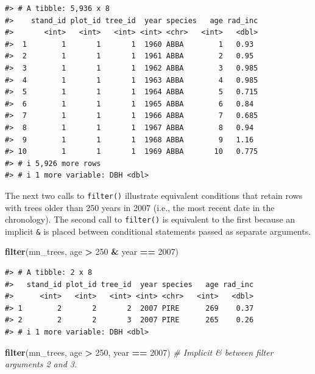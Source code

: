 \documentclass[
  11pt,
]{krantz}
\newenvironment{Shaded}{\begin{snugshade}}{\end{snugshade}}
\newcommand{\CommentTok}[1]{\textcolor[rgb]{0.56,0.35,0.01}{\textit{#1}}}
\newcommand{\DecValTok}[1]{\textcolor[rgb]{0.00,0.00,0.81}{#1}}
\newcommand{\KeywordTok}[1]{\textcolor[rgb]{0.13,0.29,0.53}{\textbf{#1}}}
\newcommand{\NormalTok}[1]{#1}
\newcommand{\OperatorTok}[1]{\textcolor[rgb]{0.81,0.36,0.00}{\textbf{#1}}}
\newcommand{\StringTok}[1]{\textcolor[rgb]{0.31,0.60,0.02}{#1}}
\theoremstyle{definition}
\theoremstyle{definition}
\theoremstyle{definition}
\theoremstyle{definition}
\theoremstyle{remark}
\begin{document}
\begin{verbatim}
#> # A tibble: 5,936 x 8
#>    stand_id plot_id tree_id  year species   age rad_inc
#>       <int>   <int>   <int> <int> <chr>   <int>   <dbl>
#>  1        1       1       1  1960 ABBA        1   0.93 
#>  2        1       1       1  1961 ABBA        2   0.95 
#>  3        1       1       1  1962 ABBA        3   0.985
#>  4        1       1       1  1963 ABBA        4   0.985
#>  5        1       1       1  1964 ABBA        5   0.715
#>  6        1       1       1  1965 ABBA        6   0.84 
#>  7        1       1       1  1966 ABBA        7   0.685
#>  8        1       1       1  1967 ABBA        8   0.94 
#>  9        1       1       1  1968 ABBA        9   1.16 
#> 10        1       1       1  1969 ABBA       10   0.775
#> # i 5,926 more rows
#> # i 1 more variable: DBH <dbl>
\end{verbatim}

The next two calls to \texttt{filter()} illustrate equivalent conditions that retain rows with trees older than 250 years in 2007 (i.e., the most recent date in the chronology). The second call to \texttt{filter()} is equivalent to the first because an implicit \texttt{\&} is placed between conditional statements passed as separate arguments.

\begin{Shaded}
\begin{Highlighting}[]
\KeywordTok{filter}\NormalTok{(mn\_trees, age }\OperatorTok{\textgreater{}}\StringTok{ }\DecValTok{250} \OperatorTok{\&}\StringTok{ }\NormalTok{year }\OperatorTok{==}\StringTok{ }\DecValTok{2007}\NormalTok{)}
\end{Highlighting}
\end{Shaded}

\begin{verbatim}
#> # A tibble: 2 x 8
#>   stand_id plot_id tree_id  year species   age rad_inc
#>      <int>   <int>   <int> <int> <chr>   <int>   <dbl>
#> 1        2       2       2  2007 PIRE      269    0.37
#> 2        2       2       3  2007 PIRE      265    0.26
#> # i 1 more variable: DBH <dbl>
\end{verbatim}

\begin{Shaded}
\begin{Highlighting}[]
\KeywordTok{filter}\NormalTok{(mn\_trees, age }\OperatorTok{\textgreater{}}\StringTok{ }\DecValTok{250}\NormalTok{, }
\NormalTok{       year }\OperatorTok{==}\StringTok{ }\DecValTok{2007}\NormalTok{) }\CommentTok{\# Implicit \& between filter arguments 2 and 3.}
\end{Highlighting}
\end{Shaded}
\end{document}
